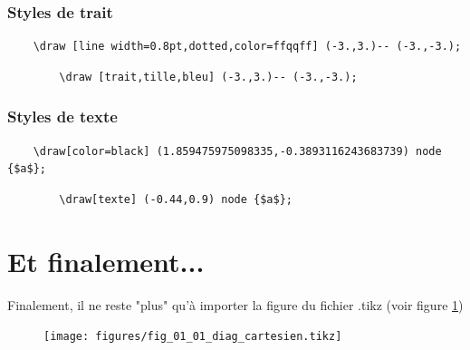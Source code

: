 \documentclass[10pt,a4paper]{report}
\begin{document}
\subsubsection{Styles de trait}

\begin{verbatim}
	\draw [line width=0.8pt,dotted,color=ffqqff] (-3.,3.)-- (-3.,-3.);
\end{verbatim}

\hspace*{4cm}
{\huge\textrightarrow \quad}
\begin{minipage}{.4\linewidth}
	\begin{verbatim}
		\draw [trait,tille,bleu] (-3.,3.)-- (-3.,-3.);
	\end{verbatim}
\end{minipage}


\subsubsection{Styles de texte}

\begin{verbatim}
	\draw[color=black] (1.859475975098335,-0.3893116243683739) node {$a$};
\end{verbatim}

\hspace*{4cm}
{\huge\textrightarrow \quad}
\begin{minipage}{.4\linewidth}
	\begin{verbatim}
		\draw[texte] (-0.44,0.9) node {$a$};
	\end{verbatim}
\end{minipage}





\section{Et finalement...}

Finalement, il ne reste "plus" qu'à importer la figure du fichier .tikz (voir figure \ref{fig:fig_01_01_diag_cartesien})

\begin{figure}[H]
	\Centering
	\texttt{[image: figures/fig\_01\_01\_diag\_cartesien.tikz]}
	\caption{}
	\label{fig:fig_01_01_diag_cartesien}
\end{figure}
\end{document}
